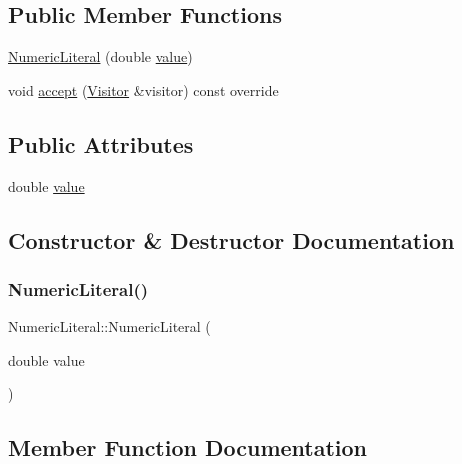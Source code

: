 \subsection*{Public Member Functions}
\begin{DoxyCompactItemize}
\item 
\hyperlink{struct_numeric_literal_a7d8479432e5f17a657279050ca611e33}{Numeric\+Literal} (double \hyperlink{struct_numeric_literal_adeef869e11ca886648a0ccb723dc6639}{value})
\item 
void \hyperlink{struct_numeric_literal_aa18c06c1b739ba725cad0593c6bde1f4}{accept} (\hyperlink{struct_visitor}{Visitor} \&visitor) const override
\end{DoxyCompactItemize}
\subsection*{Public Attributes}
\begin{DoxyCompactItemize}
\item 
double \hyperlink{struct_numeric_literal_adeef869e11ca886648a0ccb723dc6639}{value}
\end{DoxyCompactItemize}


\subsection{Constructor \& Destructor Documentation}
\mbox{\label{struct_numeric_literal_a7d8479432e5f17a657279050ca611e33}} 
\subsubsection{\texorpdfstring{Numeric\+Literal()}{NumericLiteral()}}
{\footnotesize\ttfamily Numeric\+Literal\+::\+Numeric\+Literal (\begin{DoxyParamCaption}\item[{double}]{value }\end{DoxyParamCaption})\hspace{0.3cm}{\ttfamily [inline]}}



\subsection{Member Function Documentation}
\mbox{\label{struct_numeric_literal_aa18c06c1b739ba725cad0593c6bde1f4}} 
